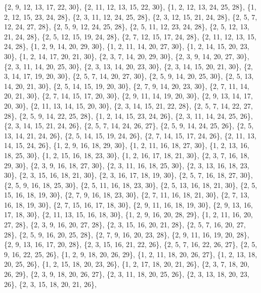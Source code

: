 \documentclass[11pt,a4paper]{article}
\begin{document}
{\{2, 9, 12, 13, 17, 22, 30\}, \{2, 11, 12, 13, 15, 22, 30\}, \{1, 2, 12, 13, 24, 25, 28\}, \{1, 2, 12, 15, 23, 24, 28\}, \{2, 3, 11, 12, 24, 25, 28\},
\{2, 3, 12, 15, 21, 24, 28\}, \{2, 5, 7, 12, 24, 27, 28\}, \{2, 5, 9, 12, 24, 25, 28\}, \{2, 5, 11, 12, 23, 24, 28\}, \{2, 5, 12, 13, 21, 24, 28\},
\{2, 5, 12, 15, 19, 24, 28\}, \{2, 7, 12, 15, 17, 24, 28\}, \{2, 11, 12, 13, 15, 24, 28\}, \{1, 2, 9, 14, 20, 29, 30\}, \{1, 2, 11, 14, 20, 27, 30\},
\{1, 2, 14, 15, 20, 23, 30\}, \{1, 2, 14, 17, 20, 21, 30\}, \{2, 3, 7, 14, 20, 29, 30\}, \{2, 3, 9, 14, 20, 27, 30\}, \{2, 3, 11, 14, 20, 25, 30\},
\{2, 3, 13, 14, 20, 23, 30\}, \{2, 3, 14, 15, 20, 21, 30\}, \{2, 3, 14, 17, 19, 20, 30\}, \{2, 5, 7, 14, 20, 27, 30\}, \{2, 5, 9, 14, 20, 25, 30\},
\{2, 5, 13, 14, 20, 21, 30\}, \{2, 5, 14, 15, 19, 20, 30\}, \{2, 7, 9, 14, 20, 23, 30\}, \{2, 7, 11, 14, 20, 21, 30\}, \{2, 7, 14, 15, 17, 20, 30\},
\{2, 9, 11, 14, 19, 20, 30\}, \{2, 9, 13, 14, 17, 20, 30\}, \{2, 11, 13, 14, 15, 20, 30\}, \{2, 3, 14, 15, 21, 22, 28\}, \{2, 5, 7, 14, 22, 27, 28\},
\{2, 5, 9, 14, 22, 25, 28\}, \{1, 2, 14, 15, 23, 24, 26\}, \{2, 3, 11, 14, 24, 25, 26\}, \{2, 3, 14, 15, 21, 24, 26\}, \{2, 5, 7, 14, 24, 26, 27\},
\{2, 5, 9, 14, 24, 25, 26\}, \{2, 5, 13, 14, 21, 24, 26\}, \{2, 5, 14, 15, 19, 24, 26\}, \{2, 7, 14, 15, 17, 24, 26\}, \{2, 11, 13, 14, 15, 24, 26\},
\{1, 2, 9, 16, 18, 29, 30\}, \{1, 2, 11, 16, 18, 27, 30\}, \{1, 2, 13, 16, 18, 25, 30\}, \{1, 2, 15, 16, 18, 23, 30\}, \{1, 2, 16, 17, 18, 21, 30\},
\{2, 3, 7, 16, 18, 29, 30\}, \{2, 3, 9, 16, 18, 27, 30\}, \{2, 3, 11, 16, 18, 25, 30\}, \{2, 3, 13, 16, 18, 23, 30\}, \{2, 3, 15, 16, 18, 21, 30\},
\{2, 3, 16, 17, 18, 19, 30\}, \{2, 5, 7, 16, 18, 27, 30\}, \{2, 5, 9, 16, 18, 25, 30\}, \{2, 5, 11, 16, 18, 23, 30\}, \{2, 5, 13, 16, 18, 21, 30\},
\{2, 5, 15, 16, 18, 19, 30\}, \{2, 7, 9, 16, 18, 23, 30\}, \{2, 7, 11, 16, 18, 21, 30\}, \{2, 7, 13, 16, 18, 19, 30\}, \{2, 7, 15, 16, 17, 18, 30\},
\{2, 9, 11, 16, 18, 19, 30\}, \{2, 9, 13, 16, 17, 18, 30\}, \{2, 11, 13, 15, 16, 18, 30\}, \{1, 2, 9, 16, 20, 28, 29\}, \{1, 2, 11, 16, 20, 27, 28\},
\{2, 3, 9, 16, 20, 27, 28\}, \{2, 3, 15, 16, 20, 21, 28\}, \{2, 5, 7, 16, 20, 27, 28\}, \{2, 5, 9, 16, 20, 25, 28\}, \{2, 7, 9, 16, 20, 23, 28\},
\{2, 9, 11, 16, 19, 20, 28\}, \{2, 9, 13, 16, 17, 20, 28\}, \{2, 3, 15, 16, 21, 22, 26\}, \{2, 5, 7, 16, 22, 26, 27\}, \{2, 5, 9, 16, 22, 25, 26\},
\{1, 2, 9, 18, 20, 26, 29\}, \{1, 2, 11, 18, 20, 26, 27\}, \{1, 2, 13, 18, 20, 25, 26\}, \{1, 2, 15, 18, 20, 23, 26\}, \{1, 2, 17, 18, 20, 21, 26\},
\{2, 3, 7, 18, 20, 26, 29\}, \{2, 3, 9, 18, 20, 26, 27\}, \{2, 3, 11, 18, 20, 25, 26\}, \{2, 3, 13, 18, 20, 23, 26\}, \{2, 3, 15, 18, 20, 21, 26\},
}
\end{document}
